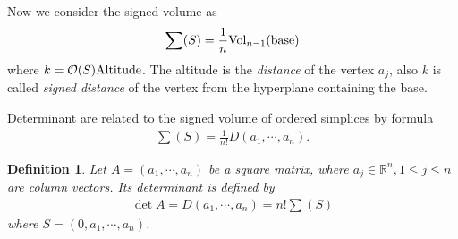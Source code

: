 \documentclass[11pt]{book}
\newtheorem{definition}{Definition}[section]
\theoremstyle{definition}
\numberwithin{equation}{subsection}
\begin{document}
Now we consider the signed volume as
\begin{align*}
    \sum (S) =\frac{1}{n}{\rm Vol}_{n-1}({\rm base})
\end{align*}
where $k = \mathcal{O}(S) {\rm Altitude}$. The altitude is the \emph{distance} of the vertex $a_j$, also $k$ is called \emph{signed distance} of the vertex from the hyperplane containing the base. 

Determinant are related to the signed volume of ordered simplices by formula
\begin{align*}
    \sum (S) = \frac{1}{n!}D(a_1,\cdots,a_n).
\end{align*}

\medskip

\begin{definition}
Let $A = (a_1,\cdots, a_n)$ be a square matrix, where $a_j\in\mathbb{R}^n, 1\leq j\leq n$ are column vectors. Its determinant is defined by 
\begin{align*}
    \det A = D(a_1,\cdots,a_n) = n! \sum (S) 
\end{align*}
where $S = (0,a_1,\cdots,a_n)$.
\end{definition}

\medskip
\end{document}
